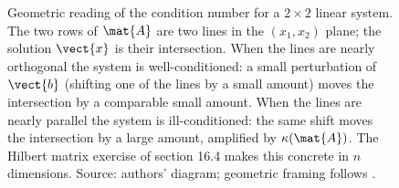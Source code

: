 \begin{figure}[ht]
\begin{tikzpicture}[x=0.6cm, y=0.6cm, font=\footnotesize]
\end{tikzpicture}
\caption[Geometric reading of the condition number]{Geometric reading of
the condition number for a $2 \times 2$ linear system. The two rows of
$\mat{A}$ are two lines in the $(x_{1}, x_{2})$ plane; the solution
$\vect{x}$ is their intersection. When the lines are nearly orthogonal
the system is well-conditioned: a small perturbation of $\vect{b}$
(shifting one of the lines by a small amount) moves the intersection by
a comparable small amount. When the lines are nearly parallel the
system is ill-conditioned: the same shift moves the intersection by a
large amount, amplified by $\kappa(\mat{A})$. The Hilbert matrix
exercise of section 16.4 makes this concrete in $n$ dimensions.
Source: authors' diagram; geometric framing follows
\cite[ch.~12]{text:trefethen-bau1997}.}
\label{fig:vol02:ch16:condition-number}
\end{figure}
